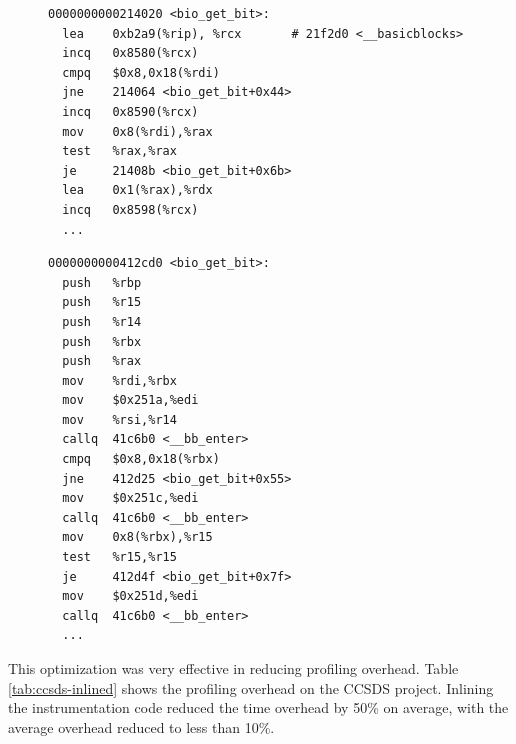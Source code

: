 \begin{figure}[t]
\begin{minipage}[t]{.48\textwidth}
        \begin{lstlisting}[caption={Disassembled code of a part of the CCSDS \texttt{bio\_get\_bit()} function, instrumented inline with load, add, and store instructions. The \texttt{lea} instruction loads the address of the \texttt{\_\_basicblocks} array into the \texttt{\%rcx} register at the start of the function, after which the \texttt{incq} instruction records each basic block's execution.}, label={lst:instrumented-inline}]
0000000000214020 <bio_get_bit>:
  lea    0xb2a9(%rip), %rcx       # 21f2d0 <__basicblocks>
  incq   0x8580(%rcx)
  cmpq   $0x8,0x18(%rdi)
  jne    214064 <bio_get_bit+0x44>
  incq   0x8590(%rcx)
  mov    0x8(%rdi),%rax
  test   %rax,%rax
  je     21408b <bio_get_bit+0x6b>
  lea    0x1(%rax),%rdx
  incq   0x8598(%rcx)
  ...
        \end{lstlisting}
    \end{minipage}%
    \hfill
    \begin{minipage}[t]{.48\textwidth}  %
        \centering
        \begin{lstlisting}[language={x86asm}, caption={Disassembled code of a part of the CCSDS \texttt{bio\_get\_bit()} function, instrumented with calls to \texttt{\_\_bb\_enter()}. The start of the function contains extra \texttt{push} instructions, as the caller has to save the contents of the registers. }, label={lst:instrumented-callq}, aboveskip=3mm]
0000000000412cd0 <bio_get_bit>:
  push   %rbp
  push   %r15
  push   %r14
  push   %rbx
  push   %rax
  mov    %rdi,%rbx
  mov    $0x251a,%edi
  mov    %rsi,%r14
  callq  41c6b0 <__bb_enter>
  cmpq   $0x8,0x18(%rbx)
  jne    412d25 <bio_get_bit+0x55>
  mov    $0x251c,%edi
  callq  41c6b0 <__bb_enter>
  mov    0x8(%rbx),%r15
  test   %r15,%r15
  je     412d4f <bio_get_bit+0x7f>
  mov    $0x251d,%edi
  callq  41c6b0 <__bb_enter>
  ...
        \end{lstlisting}
    \end{minipage}
\end{figure}


This optimization was very effective in reducing profiling overhead. Table \ref{tab:ccsds-inlined} shows the profiling overhead on the CCSDS project. Inlining the instrumentation code reduced the time overhead by 50\% on average, with the average overhead reduced to less than 10\%.

